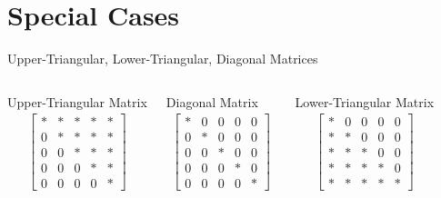 \documentclass[svgnames,table,,aspectratio=169]{beamer}
\begin{document}
\section{Special Cases}

\begin{frame}{Upper-Triangular, Lower-Triangular, Diagonal Matrices}

  \begin{columns}

    Upper-Triangular Matrix
    \begin{eqnarray*}
      \left[
      \begin{array}{rrrrr}
        * & * & * & * & * \\
        0 & * & * & * & * \\
        0 & 0 & * & * & * \\
        0 & 0 & 0 & * & * \\
        0 & 0 & 0 & 0 & * 
      \end{array}
      \right]
    \end{eqnarray*}


    Diagonal Matrix
    \begin{eqnarray*}
      \left[
      \begin{array}{rrrrr}
        * & 0 & 0 & 0 & 0 \\
        0 & * & 0 & 0 & 0 \\
        0 & 0 & * & 0 & 0 \\
        0 & 0 & 0 & * & 0 \\
        0 & 0 & 0 & 0 & * 
      \end{array}
      \right]
    \end{eqnarray*}


    Lower-Triangular Matrix
    \begin{eqnarray*}
      \left[
      \begin{array}{rrrrr}
        * & 0 & 0 & 0 & 0 \\
        * & * & 0 & 0 & 0 \\
        * & * & * & 0 & 0 \\
        * & * & * & * & 0 \\
        * & * & * & * & * 
      \end{array}
      \right]
    \end{eqnarray*}

    
  \end{columns}
  
\end{frame}
\end{document}
